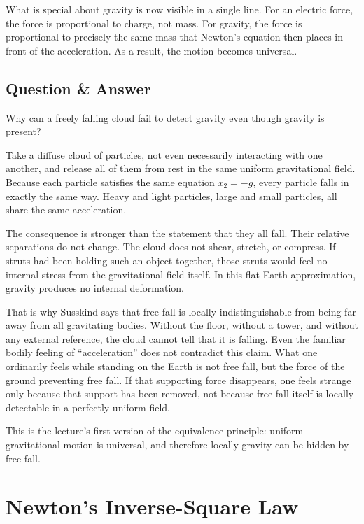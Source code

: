 What is special about gravity is now visible in a single line. For an electric force, the force is proportional to charge, not mass. For gravity, the force is proportional to precisely the same mass that Newton's equation then places in front of the acceleration. As a result, the motion becomes universal.

\subsection{Question \& Answer}

Why can a freely falling cloud fail to detect gravity even though gravity is present?

Take a diffuse cloud of particles, not even necessarily interacting with one another, and release all of them from rest in the same uniform gravitational field. Because each particle satisfies the same equation \(\ddot x_2=-g\), every particle falls in exactly the same way. Heavy and light particles, large and small particles, all share the same acceleration.

The consequence is stronger than the statement that they all fall. Their relative separations do not change. The cloud does not shear, stretch, or compress. If struts had been holding such an object together, those struts would feel no internal stress from the gravitational field itself. In this flat-Earth approximation, gravity produces no internal deformation.

That is why Susskind says that free fall is locally indistinguishable from being far away from all gravitating bodies. Without the floor, without a tower, and without any external reference, the cloud cannot tell that it is falling. Even the familiar bodily feeling of ``acceleration'' does not contradict this claim. What one ordinarily feels while standing on the Earth is not free fall, but the force of the ground preventing free fall. If that supporting force disappears, one feels strange only because that support has been removed, not because free fall itself is locally detectable in a perfectly uniform field.

This is the lecture's first version of the equivalence principle: uniform gravitational motion is universal, and therefore locally gravity can be hidden by free fall.

\section{Newton's Inverse-Square Law}

